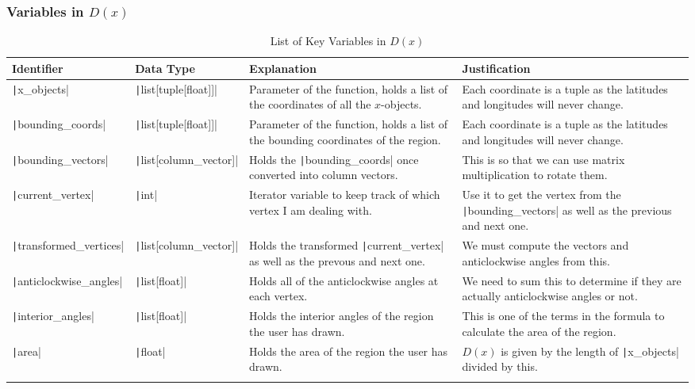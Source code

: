 \documentclass[12pt]{report}
\newcommand{\pil}[1]{\texttt|#1|}
\begin{document}
\subsubsection{Variables in $D\left(x\right)$}
\begin{center}
\begin{longtable}{ | m{3cm} | m{4cm}| m{4cm} | m{4cm} |} 
    \hline
    \textbf{Identifier} & \textbf{Data Type} & \textbf{Explanation}  & \textbf{Justification} \\ 
    \hline
    \pil{x_objects} & \pil{list[tuple[float]]} & Parameter of the function, holds a list of the coordinates of all the $x$-objects. & Each coordinate is a tuple as the latitudes and longitudes will never change. \\ 
    \hline
    \pil{bounding_coords} & \pil{list[tuple[float]]} & Parameter of the function, holds a list of the bounding coordinates of the region. & Each coordinate is a tuple as the latitudes and longitudes will never change. \\ 
    \hline
    \pil{bounding_vectors} & \pil{list[column_vector]} & Holds the \pil{bounding_coords} once converted into column vectors. & This is so that we can use matrix multiplication to rotate them. \\ 
    \hline
    \pil{current_vertex} & \pil{int} & Iterator variable to keep track of which vertex I am dealing with. & Use it to get the vertex from the \pil{bounding_vectors} as well as the previous and next one. \\ 
    \hline
    \pil{transformed_vertices} & \pil{list[column_vector]} & Holds the transformed \pil{current_vertex} as well as the prevous and next one. & We must compute the vectors and anticlockwise angles from this. \\ 
    \hline
    \pil{anticlockwise_angles} & \pil{list[float]} & Holds all of the anticlockwise angles at each vertex. & We need to sum this to determine if they are actually anticlockwise angles or not. \\ 
    \hline
    \pil{interior_angles} & \pil{list[float]} & Holds the interior angles of the region the user has drawn. & This is one of the terms in the formula to calculate the area of the region. \\ 
    \hline
    \pil{area} & \pil{float} & Holds the area of the region the user has drawn. & $D\left(x\right)$ is given by the length of \pil{x_objects} divided by this. \\ 
    \hline
\caption{List of Key Variables in $D\left(x\right)$}
\end{longtable}
\end{center}
\end{document}
